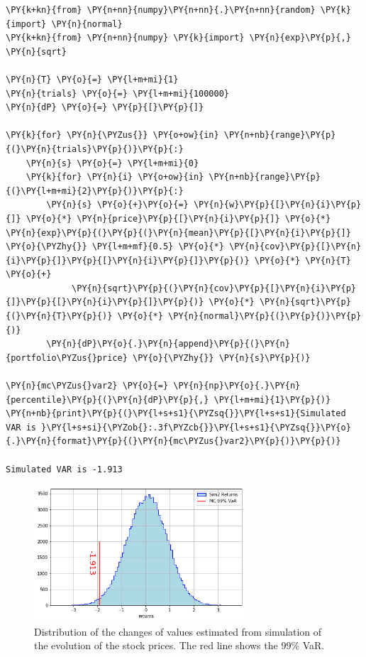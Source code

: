 \begin{tcolorbox}[breakable, size=fbox, boxrule=1pt, pad at break*=1mm,colback=cellbackground, colframe=cellborder]
\begin{Verbatim}[commandchars=\\\{\}]
\PY{k+kn}{from} \PY{n+nn}{numpy}\PY{n+nn}{.}\PY{n+nn}{random} \PY{k}{import} \PY{n}{normal}
\PY{k+kn}{from} \PY{n+nn}{numpy} \PY{k}{import} \PY{n}{exp}\PY{p}{,} \PY{n}{sqrt}
		
\PY{n}{T} \PY{o}{=} \PY{l+m+mi}{1}
\PY{n}{trials} \PY{o}{=} \PY{l+m+mi}{100000}
\PY{n}{dP} \PY{o}{=} \PY{p}{[}\PY{p}{]}
		
\PY{k}{for} \PY{n}{\PYZus{}} \PY{o+ow}{in} \PY{n+nb}{range}\PY{p}{(}\PY{n}{trials}\PY{p}{)}\PY{p}{:}
    \PY{n}{s} \PY{o}{=} \PY{l+m+mi}{0}
    \PY{k}{for} \PY{n}{i} \PY{o+ow}{in} \PY{n+nb}{range}\PY{p}{(}\PY{l+m+mi}{2}\PY{p}{)}\PY{p}{:}
        \PY{n}{s} \PY{o}{+}\PY{o}{=} \PY{n}{w}\PY{p}{[}\PY{n}{i}\PY{p}{]} \PY{o}{*} \PY{n}{price}\PY{p}{[}\PY{n}{i}\PY{p}{]} \PY{o}{*} \PY{n}{exp}\PY{p}{(}\PY{p}{(}\PY{n}{mean}\PY{p}{[}\PY{n}{i}\PY{p}{]} \PY{o}{\PYZhy{}} \PY{l+m+mf}{0.5} \PY{o}{*} \PY{n}{cov}\PY{p}{[}\PY{n}{i}\PY{p}{]}\PY{p}{[}\PY{n}{i}\PY{p}{]}\PY{p}{)} \PY{o}{*} \PY{n}{T} \PY{o}{+} 
             \PY{n}{sqrt}\PY{p}{(}\PY{n}{cov}\PY{p}{[}\PY{n}{i}\PY{p}{]}\PY{p}{[}\PY{n}{i}\PY{p}{]}\PY{p}{)} \PY{o}{*} \PY{n}{sqrt}\PY{p}{(}\PY{n}{T}\PY{p}{)} \PY{o}{*} \PY{n}{normal}\PY{p}{(}\PY{p}{)}\PY{p}{)}
        \PY{n}{dP}\PY{o}{.}\PY{n}{append}\PY{p}{(}\PY{n}{portfolio\PYZus{}price} \PY{o}{\PYZhy{}} \PY{n}{s}\PY{p}{)}
		
\PY{n}{mc\PYZus{}var2} \PY{o}{=} \PY{n}{np}\PY{o}{.}\PY{n}{percentile}\PY{p}{(}\PY{n}{dP}\PY{p}{,} \PY{l+m+mi}{1}\PY{p}{)}
\PY{n+nb}{print}\PY{p}{(}\PY{l+s+s1}{\PYZsq{}}\PY{l+s+s1}{Simulated VAR is }\PY{l+s+si}{\PYZob{}:.3f\PYZcb{}}\PY{l+s+s1}{\PYZsq{}}\PY{o}{.}\PY{n}{format}\PY{p}{(}\PY{n}{mc\PYZus{}var2}\PY{p}{)}\PY{p}{)}

Simulated VAR is -1.913
\end{Verbatim}
\end{tcolorbox}

\begin{figure}[htb]
	\centering
	\includegraphics[width=0.7\textwidth]{figures/sim2_var}
	\caption{Distribution of the changes of values estimated from simulation of the evolution of the stock prices. The red line shows the 99\% VaR.}
	\label{fig:mc2_var}
\end{figure}

